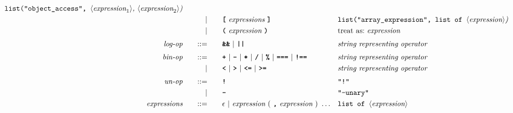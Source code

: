 \begin{alignat*}{9}
                                                           && \texttt{list("object\_access",  } \langle \textit{expression}_1\rangle \textit{,  } \langle \textit{expression}_2\rangle \textit{)} \\
&&                       && |   &\quad &&   \textbf{\texttt{[}}\
                                            \textit{expressions}\
                                            \textbf{\texttt{]}}
                                                           && \texttt{list("array\_expression", list of  } \langle \textit{expression}\rangle \textit{)} \\
&&                       && |   &\quad &&  \textbf{\texttt{(}}\  \textit{expression} \
                                            \textbf{\texttt{)}} && \textrm{treat as:}\ \textit{expression} \\[1mm]
&& \textit{log-op}
                        &&\quad  ::= &\quad && \textbf{\texttt{\&\&}}\ |\ \texttt{\textbf{||}}
                                          && \textit{string representing operator} \\[1mm]
&& \textit{bin-op}
                        &&\quad  ::= &\quad && \textbf{\texttt{+}}\ |\ \textbf{\texttt{-}}\ |\ \textbf{\texttt{*}}\ |\ \textbf{\texttt{/}}\ |\ \textbf{\texttt{\%}}\ |\
                                   \textbf{\texttt{===}}\ |\ \textbf{\texttt{!==}}  && \textit{string representing operator} \\
&&                       && |  &\quad &&  \texttt{\textbf{<}}\ |\ \texttt{\textbf{>}}\ |\ \texttt{\textbf{<=}}\ |\ \texttt{\textbf{>=}}
                                          && \textit{string representing operator} \\[1mm]
&& \textit{un-op}
                        &&\quad  ::= &\quad && \textbf{\texttt{!}}
                        && \texttt{"!"} \\
&&
                        && | &\quad && \textbf{\texttt{-}}
                        && \texttt{"-unary"} \\
&& \textit{expressions}  &&\quad  ::= &\quad && \epsilon\ | \ \textit{expression}\ (
                                                               \ \textbf{\texttt{,}} \
                                                                 \textit{expression} \
                                                                      )\ \ldots
                                                            && \texttt{list of  } \langle \textit{expression}\rangle  \\
\end{alignat*}



